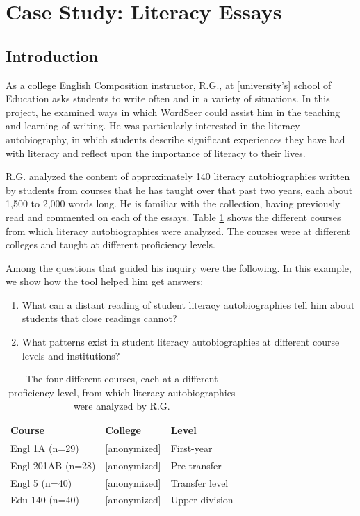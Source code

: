 \documentclass{sig-alternate}
\begin{document}
\section{Case Study: Literacy Essays}

\subsection{Introduction}
As a college English Composition instructor,  R.G., at  [university's] school of Education asks students to write often and in a variety of situations. In this project, he examined ways in which WordSeer could assist him in the teaching and learning of writing. He was particularly interested in the literacy autobiography, in which students describe significant experiences they have had with literacy and reflect upon the importance of literacy to their lives.  

R.G. analyzed the content of approximately 140 literacy autobiographies written by students from courses that he has taught over that past two years, each about 1,500 to 2,000 words long. He is familiar with the collection, having previously read and commented on each of the essays.  Table \ref{table:rex-courses} shows the different courses from which literacy autobiographies were analyzed. The courses were at different colleges and taught at different proficiency levels.

Among the questions that guided his inquiry were the following. In this example, we show how the tool helped him get answers:
\begin{enumerate}
\item What can a distant reading of student literacy autobiographies tell him about students that close readings cannot?
\item What patterns exist in student literacy autobiographies at different course levels and institutions?
\end{enumerate}

\begin{table}
\begin{tabular}{lll}
Course& College & Level \\
\hline
Engl 1A (n=29) & [anonymized] & First-year \\
Engl 201AB (n=28) & [anonymized] & Pre-transfer \\
Engl 5 (n=40) & [anonymized] & Transfer level \\
Edu 140 (n=40) & [anonymized] & Upper division \\
\end{tabular}
\caption{The four different courses, each at a different proficiency level, from which literacy autobiographies were analyzed by R.G. \label{table:rex-courses}}
\end{table}
\end{document}
